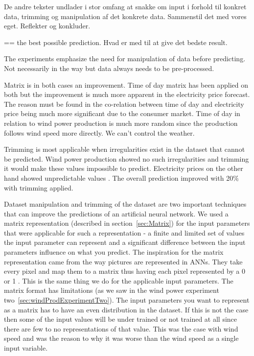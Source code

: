 De andre tekster undlader i stor omfang at snakke om input i forhold til konkret data, trimming og manipulation af det konkrete data. Sammenstil det med vores eget. Reflekter og konkluder.

== the best possible prediction. Hvad er med til at give det bedste result.

The experiments emphasize the need for manipulation of data before predicting. Not necessarily in the way but data always needs to be pre-processed.

Matrix is in both cases an improvement. Time of day matrix has been applied on both but the improvement is much more apparent in the electricity price forecast. The reason must be found in the co-relation between time of day and electricity price being much more significant due to the consumer market. Time of day in relation to wind power production is much more random since the production follows wind speed more directly. We can't control the weather. 

Trimming is most applicable when irregularities exist in the dataset that cannot be predicted. Wind power production showed no such irregularities and trimming it would make these values impossible to predict. Electricity prices on the other hand showed unpredictable values . The overall prediction improved with 20\% with trimming applied. 

Dataset manipulation and trimming of the dataset are two important techniques that can improve the predictions of an artificial neural network. We used a matrix representation (described in section~\ref{sec:Matrix}) for the input parameters that were applicable for such a representation - a finite and limited set of values the input parameter can represent and a significant difference between the input parameters influence on what you predict. The inspiration for the matrix representation came from the way pictures are represented in ANNs. They take every pixel and map them to a matrix thus having each pixel represented by a 0 or 1 . This is the same thing we do for the applicable input parameters. The matrix format has limitations (as we saw in the wind power experiment two~\ref{sec:windProdExperimentTwo}). The input parameters you want to represent as a matrix has to have an even distribution in the dataset. If this is not the case then some of the input values will be under trained or not trained at all since there are few to no representations of that value. This was the case with wind speed and was the reason to why it was worse than the wind speed as a single input variable.